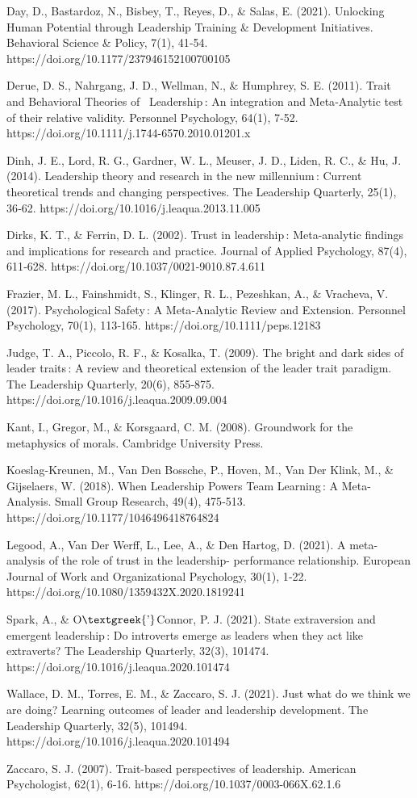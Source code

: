 \documentclass{article}
\begin{document}
Day, D., Bastardoz, N., Bisbey, T., Reyes, D., \& Salas, E. (2021). Unlocking Human Potential through Leadership
Training \& Development Initiatives. Behavioral Science \& Policy, 7(1), 41‑54.
https://doi.org/10.1177/237946152100700105

Derue, D. S., Nahrgang, J. D., Wellman, N., \& Humphrey, S. E. (2011). Trait and Behavioral Theories of
\ Leadership\leavevmode\,: An integration and Meta‐Analytic test of their relative validity. Personnel Psychology,
64(1), 7‑52. https://doi.org/10.1111/j.1744-6570.2010.01201.x

Dinh, J. E., Lord, R. G., Gardner, W. L., Meuser, J. D., Liden, R. C., \& Hu, J. (2014). Leadership theory and research
in the new millennium\leavevmode\,: Current theoretical trends and changing perspectives. The Leadership Quarterly,
25(1), 36‑62. https://doi.org/10.1016/j.leaqua.2013.11.005

Dirks, K. T., \& Ferrin, D. L. (2002). Trust in leadership\leavevmode\,: Meta-analytic findings and implications for
research and practice. Journal of Applied Psychology, 87(4), 611‑628. https://doi.org/10.1037/0021-9010.87.4.611

Frazier, M. L., Fainshmidt, S., Klinger, R. L., Pezeshkan, A., \& Vracheva, V. (2017). Psychological
Safety\leavevmode\,: A Meta‐Analytic Review and Extension. Personnel Psychology, 70(1), 113‑165.
https://doi.org/10.1111/peps.12183

Judge, T. A., Piccolo, R. F., \& Kosalka, T. (2009). The bright and dark sides of leader traits\leavevmode\,: A review
and theoretical extension of the leader trait paradigm. The Leadership Quarterly, 20(6), 855‑875.
https://doi.org/10.1016/j.leaqua.2009.09.004

Kant, I., Gregor, M., \& Korsgaard, C. M. (2008). Groundwork for the metaphysics of morals. Cambridge University Press.

Koeslag-Kreunen, M., Van Den Bossche, P., Hoven, M., Van Der Klink, M., \& Gijselaers, W. (2018). When Leadership Powers
Team Learning\leavevmode\,: A Meta-Analysis. Small Group Research, 49(4), 475‑513.
https://doi.org/10.1177/1046496418764824

Legood, A., Van Der Werff, L., Lee, A., \& Den Hartog, D. (2021). A meta-analysis of the role of trust in the
leadership- performance relationship. European Journal of Work and Organizational Psychology, 30(1), 1‑22.
https://doi.org/10.1080/1359432X.2020.1819241

Spark, A., \& O$\text{\textgreek{’}}$Connor, P. J. (2021). State extraversion and emergent leadership\leavevmode\,: Do
introverts emerge as leaders when they act like extraverts? The Leadership Quarterly, 32(3), 101474.
https://doi.org/10.1016/j.leaqua.2020.101474

Wallace, D. M., Torres, E. M., \& Zaccaro, S. J. (2021). Just what do we think we are doing? Learning outcomes of leader
and leadership development. The Leadership Quarterly, 32(5), 101494. https://doi.org/10.1016/j.leaqua.2020.101494

Zaccaro, S. J. (2007). Trait-based perspectives of leadership. American Psychologist, 62(1), 6‑16.
https://doi.org/10.1037/0003-066X.62.1.6
\end{document}
